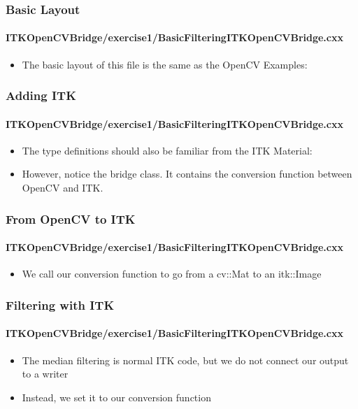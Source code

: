 \begin{frame}
\frametitle{Basic Layout}
\framesubtitle{ITKOpenCVBridge/exercise1/BasicFilteringITKOpenCVBridge.cxx}
\begin{itemize}
\item The basic layout of this file is the same as the OpenCV
  Examples:
\end{itemize}
\end{frame}

\begin{frame}
\frametitle{Adding ITK}
\framesubtitle{ITKOpenCVBridge/exercise1/BasicFilteringITKOpenCVBridge.cxx}
\begin{itemize}
\item The type definitions should also be familiar from the ITK
  Material:
\item However, notice the bridge class. It contains the conversion function
between OpenCV and ITK.
\end{itemize}
\end{frame}

\begin{frame}
\frametitle{From OpenCV to ITK}
\framesubtitle{ITKOpenCVBridge/exercise1/BasicFilteringITKOpenCVBridge.cxx}
\begin{itemize}
\item We call our conversion function to go from a cv::Mat to an
  itk::Image
\end{itemize}
\end{frame}

\begin{frame}
\frametitle{Filtering with ITK}
\framesubtitle{ITKOpenCVBridge/exercise1/BasicFilteringITKOpenCVBridge.cxx}
\begin{itemize}
\item The median filtering is normal ITK code, but we do not connect our
output to a writer
\pause
\item Instead, we set it to our conversion function
\end{itemize}
\end{frame}

